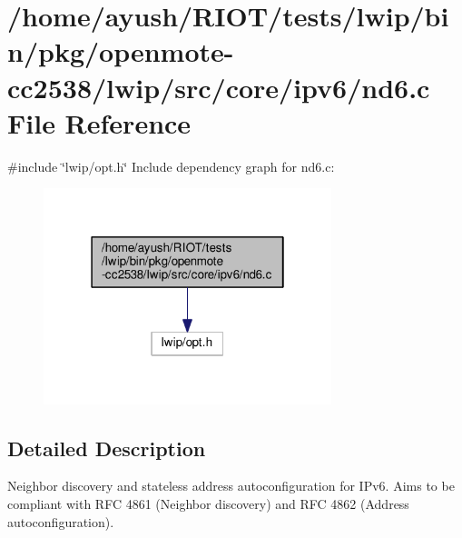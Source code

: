 \hypertarget{openmote-cc2538_2lwip_2src_2core_2ipv6_2nd6_8c}{}\section{/home/ayush/\+R\+I\+O\+T/tests/lwip/bin/pkg/openmote-\/cc2538/lwip/src/core/ipv6/nd6.c File Reference}
\label{openmote-cc2538_2lwip_2src_2core_2ipv6_2nd6_8c}
{\ttfamily \#include \char`\"{}lwip/opt.\+h\char`\"{}}\newline
Include dependency graph for nd6.\+c\+:
\nopagebreak
\begin{figure}[H]
\begin{center}
\leavevmode
\includegraphics[width=238pt]{openmote-cc2538_2lwip_2src_2core_2ipv6_2nd6_8c__incl}
\end{center}
\end{figure}


\subsection{Detailed Description}
Neighbor discovery and stateless address autoconfiguration for I\+Pv6. Aims to be compliant with R\+FC 4861 (Neighbor discovery) and R\+FC 4862 (Address autoconfiguration). 